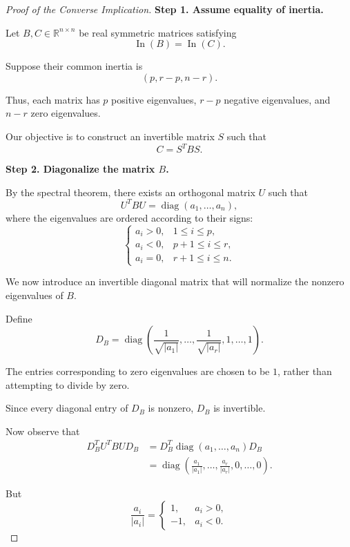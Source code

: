 \documentclass[11pt]{article}
\theoremstyle{definition}
\theoremstyle{remark}
\begin{document}
\begin{proof}[Proof of the Converse Implication]

\textbf{Step 1. Assume equality of inertia.}

Let $B,C\in\mathbb{R}^{n\times n}$ be
real symmetric matrices satisfying
\[
    \operatorname{In}(B)
    =\operatorname{In}(C).
\]

Suppose their common inertia is
\[
    (p,r-p,n-r).
\]

Thus, each matrix has $p$ positive
eigenvalues, $r-p$ negative eigenvalues,
and $n-r$ zero eigenvalues.

Our objective is to construct an invertible
matrix $S$ such that
\[
    C=S^TBS.
\]

\medskip

\textbf{Step 2. Diagonalize the matrix $B$.}

By the spectral theorem, there exists
an orthogonal matrix $U$ such that
\[
    U^TBU=
    \operatorname{diag}
    (a_1,\ldots,a_n),
\]
where the eigenvalues are ordered
according to their signs:
\[
\begin{cases}
    a_i>0, &1\leq i\leq p,\\
    a_i<0, &p+1\leq i\leq r,\\
    a_i=0, &r+1\leq i\leq n.
\end{cases}
\]

We now introduce an invertible diagonal
matrix that will normalize the nonzero
eigenvalues of $B$.

Define
\[
    D_B=
    \operatorname{diag}
    \left(
    \frac{1}{\sqrt{|a_1|}},
    \ldots,
    \frac{1}{\sqrt{|a_r|}},
    1,\ldots,1
    \right).
\]

The entries corresponding to zero
eigenvalues are chosen to be $1$,
rather than attempting to divide
by zero.

Since every diagonal entry of $D_B$
is nonzero, $D_B$ is invertible.

Now observe that
\[
\begin{aligned}
    D_B^TU^TBUD_B
    &=
    D_B^T
    \operatorname{diag}(a_1,\ldots,a_n)
    D_B\\
    &=
    \operatorname{diag}
    \left(
    \frac{a_1}{|a_1|},
    \ldots,
    \frac{a_r}{|a_r|},
    0,\ldots,0
    \right).
\end{aligned}
\]

But
\[
    \frac{a_i}{|a_i|}
    =
    \begin{cases}
        1, &a_i>0,\\
        -1, &a_i<0.
    \end{cases}
\]


\end{proof}
\end{document}
